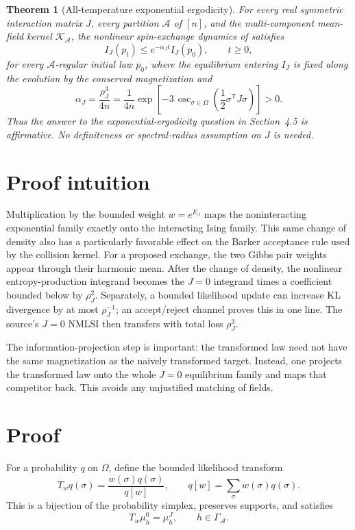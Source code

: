 \documentclass[11pt]{article}
\newtheorem{theorem}{Theorem}
\newcommand{\osc}{\operatorname{osc}}
\newcommand{\cA}{\mathcal A}
\newcommand{\cK}{\mathcal K}
\begin{document}
\begin{theorem}[All-temperature exponential ergodicity]\label{thm:main}
For every real symmetric interaction matrix $J$, every partition $\cA$ of
$[n]$, and the multi-component mean-field kernel $\cK_{\cA}$, the nonlinear
spin-exchange dynamics of \cite{source} satisfies
\[
 I_J(p_t)\le e^{-\alpha_Jt}I_J(p_0),\qquad t\ge0,
\]
for every $\cA$-regular initial law $p_0$, where the equilibrium entering
$I_J$ is fixed along the evolution by the conserved magnetization and
\[
 \boxed{\displaystyle
 \alpha_J=\frac{\rho_J^3}{4n}
 =\frac1{4n}\exp\!\left[-3\,
       \osc_{\sigma\in\Omega}\!\left(\frac12\sigma^{\mathsf T}J\sigma\right)
                 \right]>0.}
\]
Thus the answer to the exponential-ergodicity question in Section~4.5 is
affirmative.  No definiteness or spectral-radius assumption on $J$ is needed.
\end{theorem}

\section{Proof intuition}

Multiplication by the bounded weight $w=e^{E_J}$ maps the noninteracting
exponential family exactly onto the interacting Ising family.  This same
change of density also has a particularly favorable effect on the Barker
acceptance rule used by the collision kernel.  For a proposed exchange, the
two Gibbs pair weights appear through their harmonic mean.  After the change
of density, the nonlinear entropy-production integrand becomes the $J=0$
integrand times a coefficient bounded below by $\rho_J^2$.  Separately, a
bounded likelihood update can increase KL divergence by at most
$\rho_J^{-1}$; an accept/reject channel proves this in one line.  The source's
$J=0$ NMLSI then transfers with total loss $\rho_J^3$.

The information-projection step is important: the transformed law need not
have the same magnetization as the naively transformed target.  Instead, one
projects the transformed law onto the whole $J=0$ equilibrium family and maps
that competitor back.  This avoids any unjustified matching of fields.

\section{Proof}

For a probability $q$ on $\Omega$, define the bounded likelihood transform
\[
 T_wq(\sigma)=\frac{w(\sigma)q(\sigma)}{q[w]},
 \qquad q[w]=\sum_{\sigma}w(\sigma)q(\sigma).
\]
This is a bijection of the probability simplex, preserves supports, and
satisfies
\begin{equation}\label{eq:family-map}
 T_w\mu^0_h=\mu^J_h,\qquad h\in\Gamma_{\cA}.
\end{equation}
\end{document}
